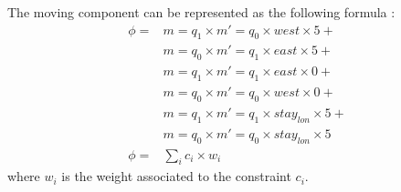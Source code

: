 \begin{example}
The moving component can be represented as the following formula :
	\begin{align*}
	\phi 	= 	& 	m=q_1 \times m'=q_0 \times west \times 5 + \\
				&	m=q_0 \times m'=q_1 \times east \times 5 + \\
				&	m=q_1 \times m'=q_1 \times east \times 0 + \\
				&	m=q_0 \times m'=q_0 \times west \times 0 + \\
				&	m=q_1 \times m'=q_1 \times stay_{lon} \times 5 + \\
				&	m=q_0 \times m'=q_0 \times stay_{lon} \times 5 \\
	\phi 	=	&	\sum_i c_i \times w_i
	\end{align*}	
	where $w_i$ is the weight associated to the constraint $c_i$.
\end{example}